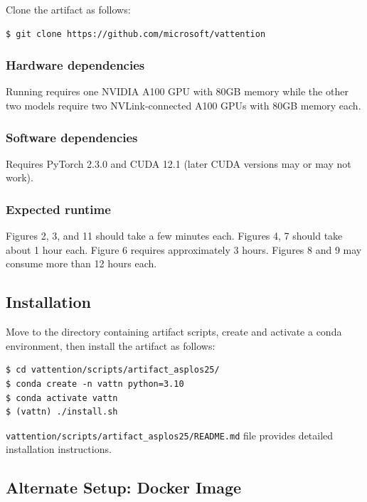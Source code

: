 Clone the artifact as follows:

\begin{Verbatim}[frame=single,rulecolor=\color{black},fontfamily=zi4,fontsize=\small]
$ git clone https://github.com/microsoft/vattention
\end{Verbatim}



\subsubsection{Hardware dependencies}
Running \yismall requires one NVIDIA A100 GPU with 80GB memory while the other two models require two NVLink-connected A100 GPUs with 80GB memory each.

\subsubsection{Software dependencies}
Requires PyTorch 2.3.0 and CUDA 12.1 (later CUDA versions may or may not work).

\subsubsection{Expected runtime} Figures 2, 3, and 11 should take a few minutes each. Figures 4, 7 should take about 1 hour each. Figure 6 requires approximately 3 hours. Figures 8 and 9 may consume more than 12 hours each.


\subsection{Installation}

Move to the directory containing artifact scripts, create and activate a conda environment, then install the artifact as follows:
\begin{Verbatim}[frame=single,rulecolor=\color{black},fontfamily=zi4,fontsize=\small]
$ cd vattention/scripts/artifact_asplos25/
$ conda create -n vattn python=3.10
$ conda activate vattn
$ (vattn) ./install.sh
\end{Verbatim}

 \verb|vattention/scripts/artifact_asplos25/README.md| file provides detailed installation instructions.
\subsection{Alternate Setup: Docker Image}

